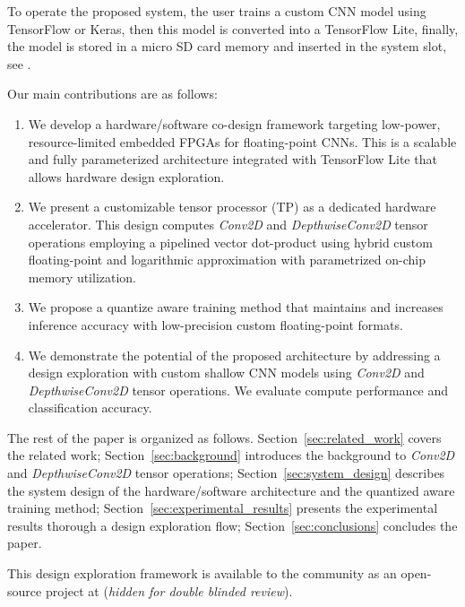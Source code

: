 To operate the proposed system, the user trains a custom CNN model using TensorFlow or Keras, then this model is converted into a TensorFlow Lite, finally, the model is stored in a micro SD card memory and inserted in the system slot, see .

Our main contributions are as follows:
\begin{enumerate}
	\item We develop a hardware/software co-design framework targeting low-power, resource-limited embedded FPGAs for floating-point CNNs. This is a scalable and fully parameterized architecture integrated with TensorFlow Lite that allows hardware design exploration.
	\item We present a customizable tensor processor (TP) as a dedicated hardware accelerator. This design computes \emph{Conv2D} and \emph{DepthwiseConv2D} tensor operations employing a pipelined vector dot-product using hybrid custom floating-point and logarithmic approximation with parametrized on-chip memory utilization.
	\item We propose a quantize aware training method that maintains and increases inference accuracy with low-precision custom floating-point formats.
	\item We demonstrate the potential of the proposed architecture by addressing a design exploration with custom shallow CNN models using \emph{Conv2D} and \emph{DepthwiseConv2D} tensor operations. We evaluate compute performance and classification accuracy.
\end{enumerate}

The rest of the paper is organized as follows. Section~\ref{sec:related_work} covers the related work; Section~\ref{sec:background} introduces the background to \emph{Conv2D} and \emph{DepthwiseConv2D} tensor operations; Section~\ref{sec:system_design} describes the system design of the hardware/software architecture and the quantized aware training method; Section~\ref{sec:experimental_results} presents the experimental results thorough a design exploration flow; Section~\ref{sec:conclusions} concludes the paper.

This design exploration framework is available to the community as an open-source project at (\emph{hidden for double blinded review}).
